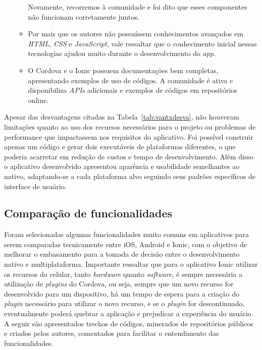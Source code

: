 \begin{itemize}
\begin{itemize}
		Novamente, recorremos à comunidade e foi dito que esses componentes não funcionam corretamente juntos.
		\item Por mais que os autores não possuíssem conhecimentos avançados em \textit{HTML}, \textit{CSS} e \textit{JavaScript}, vale ressaltar que o conhecimento inicial nessas tecnologias ajudou muito 
		durante o desenvolvimento do \textit{app}.
		\item O Cordova e o Ionic possuem documentações bem completas, apresentando exemplos de uso de códigos. A comunidade é ativa e disponibiliza \textit{APIs} adicionais e exemplos de códigos em repositórios online.
	\end{itemize}
 \end{itemize} 

Apesar das desvantagens citadas na Tabela~\ref{tab:vantxdesva}, não houveram limitações quanto ao uso dos recursos necessários para o projeto 
ou problemas de performance que impactassem nos requisitos do aplicativo.
Foi possível construir apenas um código e gerar dois executáveis de plataformas diferentes, o que poderia acarretar em redução de custos e tempo de desenvolvimento.
Além disso o aplicativo desenvolvido apresentou aparência e usabilidade semelhantes ao nativo, adaptando-se a cada plataforma alvo seguindo seus padrões específicos de interface de usuário.

\subsection{Comparação de funcionalidades} \label{subsec:comparacaofuncionalidades}

Foram selecionadas algumas funcionalidades muito comuns em aplicativos para serem comparadas tecnicamente entre iOS, Android e Ionic, com o objetivo de melhorar o embasamento para a tomada de decisão entre o desenvolvimento 
nativo e multiplataforma. Importante ressaltar que para o aplicativo Ionic utilizar os recursos do celular, tanto \textit{hardware} quanto \textit{software}, é sempre necessária a utilização de 
\textit{plugins} do Cordova, ou seja, sempre que um novo recurso for desenvolvido para um dispositivo, há um tempo de espera para a criação do \textit{plugin} necessário para utilizar o novo recurso, 
e se o \textit{plugin} for descontinuado, eventualmente poderá quebrar a aplicação e prejudicar a experiência do usuário. A seguir são apresentados trechos de códigos, minerados de repositórios públicos e criados 
pelos autores, comentados para facilitar o entendimento das funcionalidades. 

